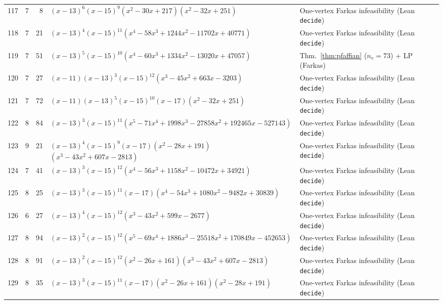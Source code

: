 \documentclass[11pt,reqno]{amsart}
\theoremstyle{definition}
\theoremstyle{remark}
\numberwithin{equation}{section}
\numberwithin{table}{section}
\begin{document}
{\begin{longtable}{@{}rrr>{\raggedright\arraybackslash}p{2.50in}>{\raggedright\arraybackslash}p{2.30in}@{}}
117 & 7 & 8 & $(x-13)^6$\allowbreak $(x-15)^9$\allowbreak $(x^2-30x+217)$\allowbreak $(x^2-32x+251)$ & One-vertex Farkas infeasibility (Lean \texttt{decide}) \\
118 & 7 & 21 & $(x-13)^4$\allowbreak $(x-15)^{11}$\allowbreak $(x^4-58x^3+1244x^2-11702x+40771)$ & One-vertex Farkas infeasibility (Lean \texttt{decide}) \\
119 & 7 & 51 & $(x-13)^5$\allowbreak $(x-15)^{10}$\allowbreak $(x^4-60x^3+1334x^2-13020x+47057)$ & Thm.~\ref{thm:pfaffian} ($n_v=73$) + LP (Farkas) \\
120 & 7 & 27 & $(x-11)$\allowbreak $(x-13)^3$\allowbreak $(x-15)^{12}$\allowbreak $(x^3-45x^2+663x-3203)$ & One-vertex Farkas infeasibility (Lean \texttt{decide}) \\
121 & 7 & 72 & $(x-11)$\allowbreak $(x-13)^5$\allowbreak $(x-15)^{10}$\allowbreak $(x-17)$\allowbreak $(x^2-32x+251)$ & One-vertex Farkas infeasibility (Lean \texttt{decide}) \\
122 & 8 & 84 & $(x-13)^3$\allowbreak $(x-15)^{11}$\allowbreak $(x^5-71x^4+1998x^3-27858x^2+192465x-527143)$ & One-vertex Farkas infeasibility (Lean \texttt{decide}) \\
123 & 9 & 21 & $(x-13)^4$\allowbreak $(x-15)^9$\allowbreak $(x-17)$\allowbreak $(x^2-28x+191)$\allowbreak $(x^3-43x^2+607x-2813)$ & One-vertex Farkas infeasibility (Lean \texttt{decide}) \\
124 & 7 & 41 & $(x-13)^3$\allowbreak $(x-15)^{12}$\allowbreak $(x^4-56x^3+1158x^2-10472x+34921)$ & One-vertex Farkas infeasibility (Lean \texttt{decide}) \\
125 & 8 & 25 & $(x-13)^3$\allowbreak $(x-15)^{11}$\allowbreak $(x-17)$\allowbreak $(x^4-54x^3+1080x^2-9482x+30839)$ & One-vertex Farkas infeasibility (Lean \texttt{decide}) \\
126 & 6 & 27 & $(x-13)^4$\allowbreak $(x-15)^{12}$\allowbreak $(x^3-43x^2+599x-2677)$ & One-vertex Farkas infeasibility (Lean \texttt{decide}) \\
127 & 8 & 94 & $(x-13)^2$\allowbreak $(x-15)^{12}$\allowbreak $(x^5-69x^4+1886x^3-25518x^2+170849x-452653)$ & One-vertex Farkas infeasibility (Lean \texttt{decide}) \\
128 & 8 & 91 & $(x-13)^2$\allowbreak $(x-15)^{12}$\allowbreak $(x^2-26x+161)$\allowbreak $(x^3-43x^2+607x-2813)$ & One-vertex Farkas infeasibility (Lean \texttt{decide}) \\
129 & 8 & 35 & $(x-13)^3$\allowbreak $(x-15)^{11}$\allowbreak $(x-17)$\allowbreak $(x^2-26x+161)$\allowbreak $(x^2-28x+191)$ & One-vertex Farkas infeasibility (Lean \texttt{decide}) \\

\end{longtable}}
\end{document}
